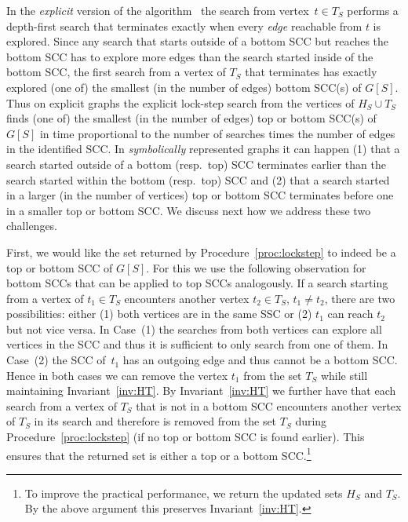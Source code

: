 \vspace{-1mm}
\smallskip{}
In the \emph{explicit} version of the algorithm~\cite{HenzingerT96,ChatterjeeDHL16} 
the search from vertex~$t \in T_S$ performs a depth-first search
that terminates exactly when every \emph{edge} reachable from $t$ is explored.
Since any search that starts outside of a bottom SCC but reaches the bottom SCC 
has to explore more edges than the search started inside of the bottom SCC, 
the first search from a vertex of $T_S$ that terminates has exactly explored 
(one of) the smallest (in the number of edges) bottom SCC(s) of $G[S]$. Thus on
explicit graphs the explicit lock-step search from the vertices of $H_S \cup T_S$
finds (one of) the smallest (in the number of edges) top or bottom 
SCC(s) of $G[S]$ in time proportional to the number of searches times the 
number of edges in the identified SCC. 
In \emph{symbolically} represented graphs it can happen (1) that
a search started outside of a bottom (resp.\ top) SCC terminates earlier than the 
search started within the bottom (resp.\ top) SCC and (2) that a search
started in a larger (in the number of vertices) top or bottom SCC terminates
before one in a smaller top or bottom SCC. We discuss next how we address these
two challenges.

\vspace{-1mm}
\smallskip{}
First, we would like the set returned by Procedure~\ref{proc:lockstep} 
to indeed be a top or bottom SCC of $G[S]$. For this we use the following observation
for bottom SCCs that can be applied to top SCCs analogously.
If a search starting from a vertex of $t_1 \in T_S$ encounters another
vertex $t_2 \in T_S$, $t_1 \ne t_2$, there are two possibilities: either (1)
both vertices are in the same SSC or (2) $t_1$ can reach 
$t_2$ but not vice versa. In Case~(1) the searches from both vertices can 
explore all vertices in the SCC and thus it is sufficient to only search from 
one of them. In Case~(2) the SCC of~$t_1$ has an outgoing
edge and thus cannot be a bottom SCC. Hence in both cases we can remove the vertex
$t_1$ from the set $T_S$ while still maintaining Invariant~\ref{inv:HT}.
By Invariant~\ref{inv:HT} we further have that each search from a vertex of $T_S$
that is not in a bottom SCC encounters another vertex of $T_S$ in its search and 
therefore is removed from the set $T_S$ during Procedure~\ref{proc:lockstep} (if no
top or bottom SCC is found earlier). This ensures that the returned set 
is either a top or a bottom SCC.\footnote{To improve the practical performance, we 
return the updated sets $H_S$ and $T_S$. By the above argument this preserves Invariant~\ref{inv:HT}.}

